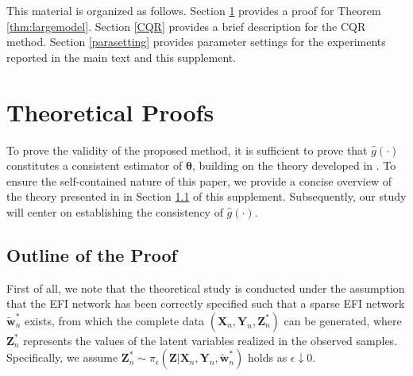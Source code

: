 \documentclass[11pt]{article}
\newcommand{\bX}{{\boldsymbol X}}
\newcommand{\bY}{{\boldsymbol Y}}
\newcommand{\bZ}{{\boldsymbol Z}}
\newcommand{\bw}{{\boldsymbol w}}
\newcommand{\btheta}{{\boldsymbol \theta}}
\begin{document}
\vspace{0.1in}


\setcounter{section}{0}
\renewcommand{\thesection}{$\S$\arabic{section}}
\setcounter{table}{0}
\renewcommand{\thetable}{S\arabic{table}}
\setcounter{figure}{0}
\renewcommand{\thefigure}{S\arabic{figure}}
\setcounter{equation}{0}
\renewcommand{\theequation}{S\arabic{equation}}
\setcounter{lemma}{0}
\renewcommand{\thelemma}{S\arabic{lemma}}
\setcounter{theorem}{0}
\renewcommand{\thetheorem}{S\arabic{theorem}}
\setcounter{remark}{0}
\renewcommand{\theremark}{S\arabic{remark}}


\bigskip
 This material is organized as follows. Section \ref{Proofsection} provides 
 a proof for Theorem \ref{thm:largemodel}. 
 Section \ref{CQR} provides a  brief description for the CQR method. 
 Section \ref{parasetting} provides parameter settings for the experiments 
 reported in the main text and this supplement. 



\section{Theoretical Proofs} \label{Proofsection}

To prove the validity of the proposed method, 
it is sufficient to prove that $\hat{g}(\cdot)$ constitutes a consistent estimator of $\btheta$, building on the theory developed in \cite{LiangKS2024EFI}.
To ensure the self-contained nature of this paper, we provide a concise overview of the theory presented in \cite{LiangKS2024EFI} in Section \ref{Sect:outline} of this supplement. Subsequently, our study will center on establishing the consistency of $\hat{g}(\cdot)$.



\subsection{Outline of the Proof} \label{Sect:outline}
First of all, we note that the theoretical study is conducted under the assumption 
that the EFI network has been correctly specified such that  a sparse EFI network  $\tilde{\bw}_n^*$ exists, from which the complete data $(\bX_n,\bY_n,\bZ_n^*)$ can be generated, 
where $\bZ_n^*$ represents the values of the latent variables realized in the observed samples. Specifically,  we assume $\bZ_n^* \sim \pi_{\epsilon}(\bZ|\bX_n,\bY_n,\tilde{\bw}_n^*)$ holds as $\epsilon \downarrow 0$.  
 
\end{document}
